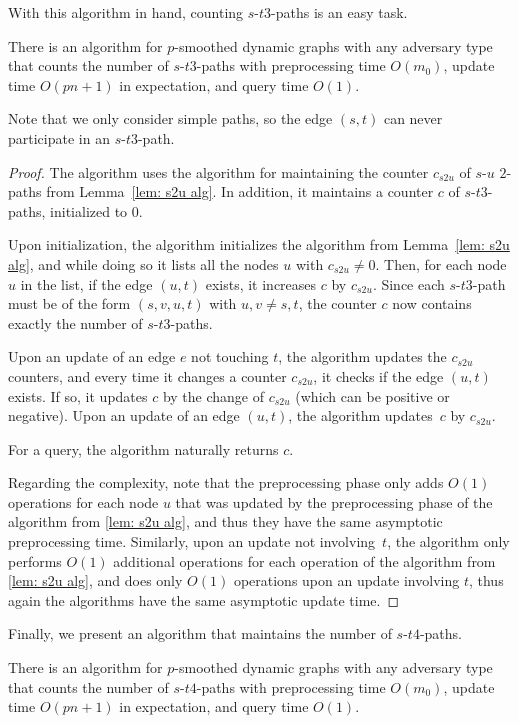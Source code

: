 \documentclass[letter,11pt]{article}
\newcommand{\st}{$s$-$t$\xspace}
\begin{document}
With this algorithm in hand, counting \st $3$-paths is an easy task.
\begin{lemma}
\label{lem:counting st 3paths}
	There is an algorithm for $p$-smoothed dynamic graphs with any adversary type
	that counts the number of \st $3$-paths with preprocessing time $O(m_0)$, 
	update time $O(pn+1)$ in expectation, 
	and query time $O(1)$.
\end{lemma}
Note that we only consider simple paths, so the edge $(s,t)$ can never participate in an \st $3$-path.

\begin{proof}
	The algorithm uses the algorithm for maintaining the counter $c_{s2u}$ of $s$-$u$ $2$-paths from Lemma~\ref{lem: s2u alg}.
	In addition, it maintains a counter $c$ of \st $3$-paths, initialized to $0$.
	
	Upon initialization, the algorithm initializes the algorithm from Lemma~\ref{lem: s2u alg}, and while doing so it lists all the nodes $u$ with $c_{s2u}\neq 0$.
	Then, for each node $u$ in the list, if the edge $(u,t)$ exists, it increases $c$ by $c_{s2u}$.
	Since each \st $3$-path must be of the form $(s,v,u,t)$ with $u,v\neq s,t$, 
	the counter $c$ now contains exactly the number of \st $3$-paths.
	
	Upon an update of an edge $e$ not touching $t$, the algorithm updates the $c_{s2u}$ counters, and every time it changes a  counter $c_{s2u}$, it checks if the edge $(u,t)$ exists.
	If so, it updates $c$ by the change of $c_{s2u}$ (which can be positive or negative).
	Upon an update of an edge $(u,t)$, the algorithm updates~$c$ by $c_{s2u}$.
	
	For a query, the algorithm naturally returns $c$.
	
	Regarding the complexity, 
	note that the preprocessing phase only adds $O(1)$ operations for each node $u$ that was updated by the preprocessing phase of the algorithm from \cref{lem: s2u alg}, and thus they have the same asymptotic preprocessing time.
	Similarly, upon an update not involving~$t$, 
	the algorithm only performs $O(1)$ additional operations for each operation of the algorithm from \cref{lem: s2u alg},
	and does only $O(1)$ operations upon an update involving $t$, thus again the algorithms have the same asymptotic update time.
\end{proof}

Finally, we present an algorithm that maintains the number of \st $4$-paths.

\begin{lemma}
\label{lem:counting st 4paths}
	There is an algorithm for $p$-smoothed dynamic graphs 
	with any adversary type
	that counts the number of \st $4$-paths with preprocessing time $O(m_0)$, 
	update time $O(pn+1)$ in expectation, 
	and query time $O(1)$.
\end{lemma}
\end{document}

